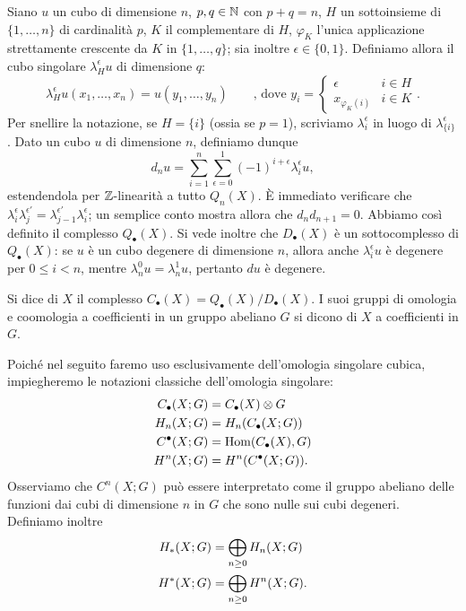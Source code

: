 Siano \(u\) un cubo di dimensione \(n\), \(p,q\in\mathbb{N}\) con \(p+q=n\), \(H\) un sottoinsieme di \(\{1,\ldots,n\}\) di cardinalità \(p\), \(K\) il complementare di \(H\), \(\varphi_K\) l'unica applicazione strettamente crescente da \(K\) in \(\{1,\ldots,q\}\); sia inoltre \(\epsilon\in\{0,1\}\). Definiamo allora il cubo singolare \(\lambda^\epsilon_Hu\) di dimensione \(q\):
\[
\lambda^\epsilon_Hu(x_1,\ldots,x_n)=u(y_1,\ldots,y_n)\qquad\text{, dove }y_i=\begin{cases}\epsilon&i\in H\\x_{\varphi_K(i)}&i\in K\end{cases}.
\]
Per snellire la notazione, se \(H=\{i\}\) (ossia se \(p=1\)), scriviamo \(\lambda^\epsilon_i\) in luogo di \(\lambda^\epsilon_{\{i\}}\). Dato un cubo \(u\) di dimensione \(n\), definiamo dunque
\[
d_nu=\sum_{i=1}^n\sum_{\epsilon=0}^1(-1)^{i+\epsilon}\lambda^\epsilon_iu,
\]
estendendola per \(\mathbb{Z}\)-linearità a tutto \(Q_n(X)\). È immediato verificare che \(\lambda^\epsilon_i\lambda^{\epsilon'}_j=\lambda^{\epsilon'}_{j-1}\lambda^\epsilon_i\); un semplice conto mostra allora che \(d_nd_{n+1}=0\). Abbiamo così definito il complesso \(Q_\bullet(X)\). Si vede inoltre che \(D_\bullet(X)\) è un sottocomplesso di \(Q_\bullet(X)\): se \(u\) è un cubo degenere di dimensione \(n\), allora anche \(\lambda^\epsilon_iu\) è degenere per \(0\le i<n\), mentre \(\lambda^0_nu=\lambda^1_nu\), pertanto \(du\) è degenere.
\begin{definition}
Si dice  di \(X\) il complesso \(C_\bullet(X)=Q_\bullet(X)/D_\bullet(X)\). I suoi gruppi di omologia e coomologia a coefficienti in un gruppo abeliano \(G\) si dicono  di \(X\) a coefficienti in \(G\).
\end{definition}
Poiché nel seguito faremo uso esclusivamente dell'omologia singolare cubica, impiegheremo le notazioni classiche dell'omologia singolare: 
\begin{align*}
C_\bullet(X;G)&=C_\bullet(X)\mathbin{\otimes} G\\
H_n(X;G)&=H_n(C_\bullet(X;G))\\
C^\bullet(X;G)&=\operatorname{Hom}(C_\bullet(X),G)\\
H^n(X;G)&=H^n(C^\bullet(X;G)).
\end{align*}
Osserviamo che \(C^n(X;G)\) può essere interpretato come il gruppo abeliano delle funzioni dai cubi di dimensione \(n\) in \(G\) che sono nulle sui cubi degeneri. Definiamo inoltre
\begin{align*}
H_*(X;G)&=\bigoplus_{n\ge 0}H_n(X;G)\\
H^*(X;G)&=\bigoplus_{n\ge 0}H^n(X;G).
\end{align*}

